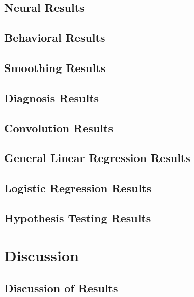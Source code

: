 \documentclass[11pt]{article}
\begin{document}
    \subsection{Neural Results}
            
    \subsection{Behavioral Results}
            
    \subsection{Smoothing Results}
            
    \subsection{Diagnosis Results}
    		
    \subsection{Convolution Results}
    		
    \subsection{General Linear Regression Results}
    		
    \subsection{Logistic Regression Results}
    		
    \subsection{Hypothesis Testing Results}
    		

\section{Discussion}

    \subsection{Discussion of Results}
            


\end{document}
